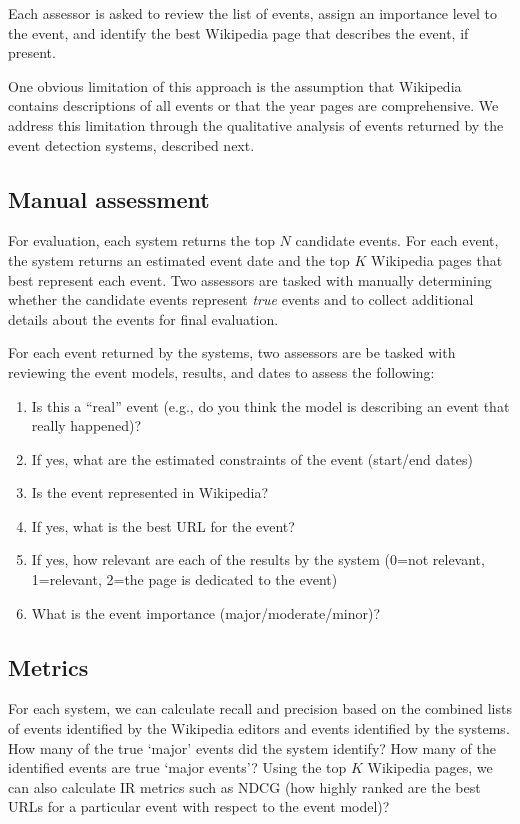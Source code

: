 \documentclass{sig-alternate}
\begin{document}
Each assessor is asked to review the list of events, assign an importance level to the event, and identify the best Wikipedia page that describes the event, if present.

One obvious limitation of this approach is the assumption that Wikipedia contains descriptions of all events or that the year pages are comprehensive.  We address this limitation through the qualitative analysis of events returned by the event detection systems, described next.

\subsection{Manual assessment}

For evaluation, each system returns the top $N$ candidate events. For each event, the system returns an estimated event date and the top $K$ Wikipedia pages that best represent each event.  Two assessors are tasked with manually determining whether the candidate events represent \emph{true} events and to collect additional details about the events for final evaluation.

For each event returned by the systems, two assessors are be tasked with reviewing the event models, results, and dates to assess the following:
\begin{enumerate}
\item Is this a ``real'' event (e.g., do you think the model is describing an event that really happened)?
\item If yes, what are the estimated constraints of the event (start/end dates)
\item Is the event represented in Wikipedia?
\item If yes, what is the best URL for the event?
\item If yes, how relevant are each of the results by the system (0=not relevant, 1=relevant, 2=the page is dedicated to the event)
\item What is the event importance (major/moderate/minor)?
\end{enumerate}

\subsection{Metrics}

For each system, we can calculate recall and precision based on the combined lists of events identified by the Wikipedia editors and events identified by the systems. How many of the true `major' events did the system identify? How many of the identified events are true `major events'?  Using the top $K$ Wikipedia pages, we can also calculate IR metrics such as NDCG (how highly ranked are the best URLs for a particular event with respect to the event model)?
\end{document}
